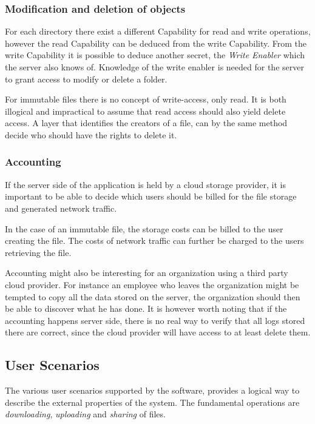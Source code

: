 \documentclass[pdftex,english,10pt,b5paper,twoside]{book}
\begin{document}
\subsubsection{Modification and deletion of objects} 

For each directory there exist a different Capability for read and write
operations, however the read Capability can be deduced from the write
Capability. From the write Capability it is possible to deduce another secret,
the \emph{Write Enabler} which the server also knows of.  Knowledge of the
write enabler is needed for the server to grant access to modify or delete a
folder. 

For immutable files there is no concept of write-access, only read. It is both
illogical and impractical to assume that read access should also yield delete
access. A layer that identifies the creators of a file, can by the same method
decide who should have the rights to delete it.

\subsubsection{Accounting}

If the server side of the application is held by a cloud storage provider, it is
important to be able to decide which users should be billed for the file storage
and generated network traffic.

In the case of an immutable file, the storage costs can be billed to the user
creating the file. The costs of network traffic can further be charged to the
users retrieving the file.

Accounting might also be interesting for an organization using a third party
cloud provider. For instance an employee who leaves the organization might be
tempted to copy all the data stored on the server, the organization should then
be able to discover what he has done. It is however worth noting that if the
accounting happens server side, there is no real way to verify that all logs
stored there are correct, since the cloud provider will have access to at least
delete them.

\subsection{User Scenarios}

The various user scenarios supported by the software, provides a logical way to
describe the external properties of the system. The fundamental operations are
\emph{downloading}, \emph{uploading} and \emph{sharing} of files.
\end{document}
